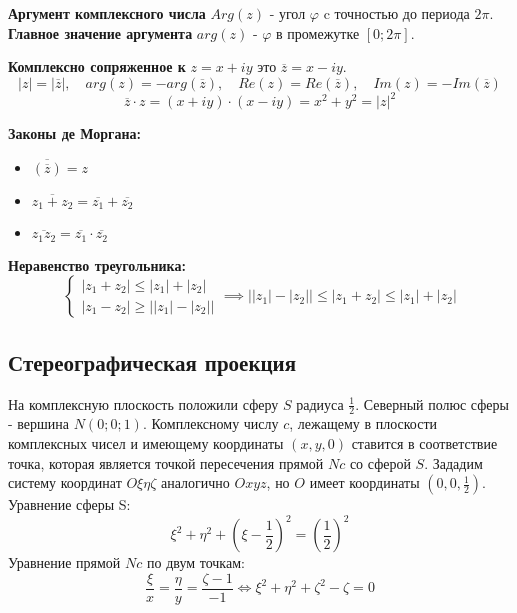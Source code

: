 \textbf{Аргумент комплексного числа} $Arg(z)$ - угол $\varphi$ c точностью до периода $2\pi$.
\textbf{Главное значение аргумента} $arg(z)$ - $\varphi$  в промежутке $[0; 2\pi]$.

\textbf{Комплексно сопряженное к} $z = x+iy$ это $\overline{z} = x - iy$.
\[|z| = |\overline{z}|, \quad arg(z) = -arg(\overline{z}), \quad 
Re(z) = Re(\overline{z}), \quad Im(z) = -Im(\overline{z})\] 
\[\overline{z} \cdot z = (x+iy)\cdot(x-iy) = x^2 + y^2 = |z|^2\] 

\textbf{Законы де Моргана:}
\begin{itemize}
    \item $\overline{(\overline{z})} = z$
    \item $\overline{z_1 + z_2} = \overline{z_1} + \overline{z_2}$
    \item $\overline{z_1z_2} = \overline{z_1} \cdot \overline{z_2}$
\end{itemize}

\textbf{Неравенство треугольника:}
\[\begin{cases}
    |z_1 + z_2| \leq |z_1| + |z_2|\\
    |z_1 - z_2| \geq \lvert \lvert z_1\rvert - \lvert z_2\rvert \rvert
\end{cases} \implies \lvert \lvert z_1 \rvert - \lvert z_2 \rvert \rvert \leq 
\lvert z_1 + z_2 \rvert \leq \lvert z_1 \rvert + \lvert z_2 \rvert \]

\subsection{Стереографическая проекция}
На комплексную плоскость положили сферу $S$ радиуса $\frac{1}{2}$. Северный полюс сферы - вершина $N(0; 0; 1)$.
Комплексному числу $c$, лежащему в плоскости комплексных чисел и имеющему координаты $(x, y, 0)$ ставится в соответствие точка, которая является точкой пересечения прямой $Nc$ со сферой $S$. 
Зададим систему координат $O\xi \eta \zeta$ аналогично $Oxyz$, 
но $O$ имеет координаты $(0, 0, \frac{1}{2})$.\\
Уравнение сферы S:
\begin{equation} 
    \label{RimanSphereEq}
    \xi^2 + \eta^2 + (\xi - \frac{1}{2})^2 = (\frac{1}{2})^2
\end{equation}
Уравнение прямой $Nc$ по двум точкам:
\begin{equation}
    \label{NcEq}
    \frac{\xi}{x} = \frac{\eta}{y}=\frac{\zeta-1}{-1} 
    \iff
    \xi^2 + \eta^2 + \zeta^2 - \zeta = 0
\end{equation}

